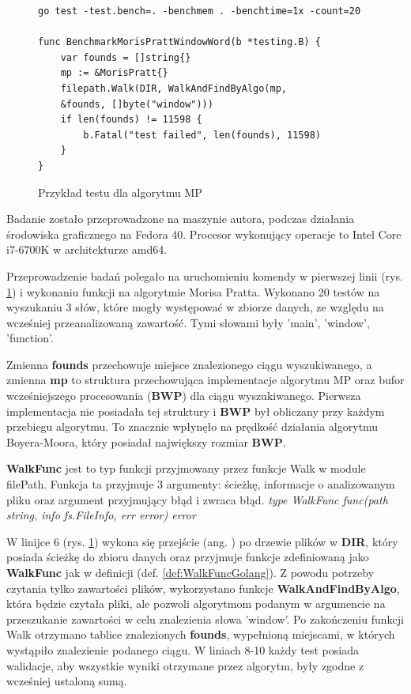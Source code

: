 \begin{figure}[htbp]
  \centering
  \begin{lstlisting}
go test -test.bench=. -benchmem . -benchtime=1x -count=20

func BenchmarkMorisPrattWindowWord(b *testing.B) {
	var founds = []string{}
	mp := &MorisPratt{}
	filepath.Walk(DIR, WalkAndFindByAlgo(mp,
    &founds, []byte("window")))
	if len(founds) != 11598 {
		b.Fatal("test failed", len(founds), 11598)
	}
}
  \end{lstlisting}
  \caption{Przykład testu dla algorytmu MP}
  \label{fig:code:examplePerfTest}
\end{figure}
Badanie zostało przeprowadzone na maszynie autora, podczas działania środowiska
graficznego na Fedora 40. Procesor wykonujący operacje to Intel Core i7-6700K
w architekturze amd64.

Przeprowadzenie badań polegało na uruchomieniu komendy w pierwszej linii (rys. 
\ref{fig:code:examplePerfTest}) i wykonaniu funkcji na algorytmie Morisa Pratta. 
Wykonano 20 testów na wyszukaniu 3 słów, które mogły występować w zbiorze danych,
ze względu na wcześniej przeanalizowaną zawartość. Tymi słowami były 
'main', 'window', 'function'.

Zmienna \textbf{founds} przechowuje miejsce znalezionego 
ciągu wyszukiwanego, a zmienna \textbf{mp} to struktura przechowująca implementacje algorytmu MP oraz
bufor wcześniejszego procesowania (\textbf{BWP}) dla ciągu wyszukiwanego. Pierwsza implementacja nie 
posiadała tej struktury i \textbf{BWP} był obliczany przy każdym przebiegu algorytmu.
To znacznie wpłynęło na prędkość działania algorytmu Boyera-Moora, który 
posiadał największy rozmiar \textbf{BWP}.

\begin{Definition}\label{def:WalkFuncGolang}
\textbf{WalkFunc} jest to typ funkcji przyjmowany przez funkcje Walk w module filePath.
Funkcja ta przyjmuje 3 argumenty: ścieżkę, informacje o analizowanym pliku oraz
argument przyjmujący błąd i zwraca błąd. \newline \newline
\textit{type WalkFunc func(path string, info fs.FileInfo, err error) error}
\end{Definition}

W linijce 6 (rys. \ref{fig:code:examplePerfTest}) wykona się przejście (ang. 
) po drzewie plików w \textbf{DIR}, który posiada ścieżkę do 
zbioru danych oraz przyjmuje funkcje zdefiniowaną jako \textbf{WalkFunc} jak w definicji
(def. \ref{def:WalkFuncGolang}). Z powodu potrzeby czytania tylko zawartości plików,
wykorzystano funkcje \textbf{WalkAndFindByAlgo}, która będzie czytała pliki, ale 
pozwoli algorytmom podanym w argumencie na przeszukanie zawartości w celu 
znalezienia słowa 'window'. Po zakończeniu funkcji Walk otrzymano 
tablice znalezionych \textbf{founds}, wypełnioną miejscami, w których wystąpiło 
znalezienie podanego ciągu. W liniach 8-10 każdy test posiada walidacje, aby wszystkie wyniki 
otrzymane przez algorytm, były zgodne z wcześniej ustaloną sumą.

